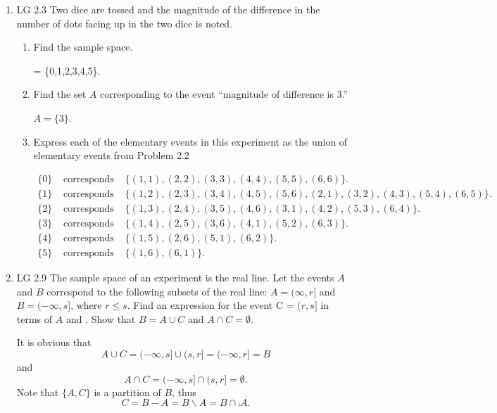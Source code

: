 \begin{enumerate}
	\item LG 2.3
	\ifdefined\sol
	Two dice are tossed and the magnitude of the difference
	in the number of dots facing up in the two dice is noted.
	\begin{enumerate}
		\item Find the sample space.
		\begin{solution}
			\sspace = \{0,1,2,3,4,5\}.
		\end{solution}

		\item Find the set $A$ corresponding to the event
		``magnitude of difference is $3$.''
		\begin{solution}
			$ A = \{3\}$.
		\end{solution}

		\item Express each of the elementary events in this experiment
		as the union of elementary events from Problem 2.2
		\begin{solution}
		\begin{eqnarray*}
			\{0\} &\mbox{ corresponds to }& \{(1,1),(2,2),(3,3),(4,4),(5,5),(6,6)\}.
			\\ \{1\} &\mbox{ corresponds to }& \{(1,2),(2,3),(3,4),(4,5),(5,6),
			(2,1),(3,2),(4,3),(5,4),(6,5)\}.
			\\ \{2\} &\mbox{ corresponds to }& \{(1,3),(2,4),(3,5),(4,6),
			(3,1),(4,2),(5,3),(6,4)\}.
			\\ \{3\} &\mbox{ corresponds to }& \{(1,4),(2,5),(3,6), (4,1),(5,2),(6,3)\}.
			\\ \{4\} &\mbox{ corresponds to }& \{(1,5),(2,6), (5,1),(6,2) \}.
			\\ \{5\} &\mbox{ corresponds to }& \{(1,6), (6,1) \}.
		\end{eqnarray*}
		\end{solution}

	\end{enumerate}
	\fi

	\item LG 2.9
	\ifdefined\sol
		The sample space of an experiment is the real line.
		Let the events $A$ and $B$ correspond to the following subsets of the real line:
		$A = (\infty, r]$ and $B = (-\infty, s]$, where $r \leq s$.
		Find an expression for the event C = $(r, s]$
		in terms of $A$ and \sB. Show that $B = A \cup C$
		and $A \cap C = \emptyset$.
		\begin{solution}
		It is obvious that
		\[
			A \cup C =( -\infty,s] \cup (s,r] = (-\infty,r] = B
		\]
		and
		\[
			A \cap C =( -\infty,s] \cap (s,r] = \emptyset.
		\]
		Note that $\{A,C\}$ is a partition of $B$,
		thus
		\[
			C = B-A = B \backslash A = B\cap \comp{A}.
		\]
		\end{solution}
	\fi


\end{enumerate}
